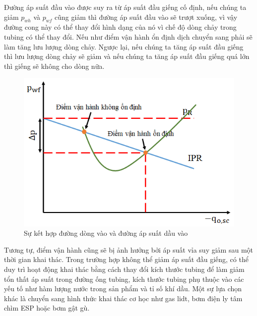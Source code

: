 \documentclass[12pt,a4paper]{report}
\begin{document}
Đường áp suất đầu vào được suy ra từ áp suất đầu giếng cố định, nếu chúng ta giảm $p_{wh}$ và $p_{wf}$ cũng giảm thì đường áp suất đầu vào sẽ trượt xuống, vì vậy đường cong này có thể thay đổi hình dạng của nó vì chế độ dòng chảy trong tubing có thể thay đổi. Nếu như điểm vận hành ổn định dịch chuyển sang phải sẽ làm tăng lưu lượng dòng chảy. Ngược lại, nếu chúng ta tăng áp suất đầu giếng thì lưu lượng dòng chảy sẽ giảm và nếu chúng ta tăng áp suất đầu giếng quá lớn thì giếng sẽ không cho dòng nữa.
	\begin{figure}[h]
		\centering
		\includegraphics[scale=0.8]{Fig/mix_between_intake_and_ipr.png}
		\caption{Sự kết hợp đường dòng vào và đường áp suất dầu vào}
		\label{fig:mix_between_intake_and_ipr}
	\end{figure}
\newline
Tương tự, điểm vận hành cũng sẽ bị ảnh hưởng bởi áp suất vỉa suy giảm sau một thời gian khai thác. Trong trường hợp không thể giảm áp suất đầu giếng, có thể duy trì hoạt động khai thác bằng cách thay đổi kích thước tubing để làm giảm tổn thất áp suất trong đường ống tubing, kích thước tubing phụ thuộc vào các yếu tố như hàm lượng nước trong sản phẩm và tỉ số khí dầu. Một sự lựa chọn khác là chuyển sang hình thức khai thác cơ học như gas lidt, bơm điện ly tâm chìm ESP  hoặc bơm gật gù.
\end{document}
